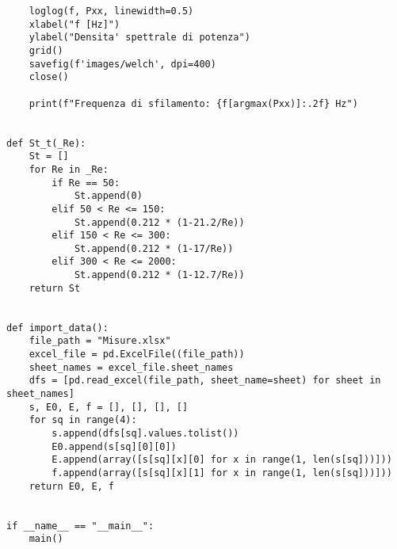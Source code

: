 \begin{lstlisting}
    loglog(f, Pxx, linewidth=0.5)
    xlabel("f [Hz]")
    ylabel("Densita' spettrale di potenza")
    grid()
    savefig(f'images/welch', dpi=400)
    close()

    print(f"Frequenza di sfilamento: {f[argmax(Pxx)]:.2f} Hz")
    

def St_t(_Re):
    St = []
    for Re in _Re:
        if Re == 50:
            St.append(0)
        elif 50 < Re <= 150:
            St.append(0.212 * (1-21.2/Re))
        elif 150 < Re <= 300:
            St.append(0.212 * (1-17/Re))
        elif 300 < Re <= 2000:
            St.append(0.212 * (1-12.7/Re))
    return St


def import_data():
    file_path = "Misure.xlsx"
    excel_file = pd.ExcelFile((file_path))
    sheet_names = excel_file.sheet_names
    dfs = [pd.read_excel(file_path, sheet_name=sheet) for sheet in sheet_names]
    s, E0, E, f = [], [], [], []
    for sq in range(4):
        s.append(dfs[sq].values.tolist())
        E0.append(s[sq][0][0])
        E.append(array([s[sq][x][0] for x in range(1, len(s[sq]))]))
        f.append(array([s[sq][x][1] for x in range(1, len(s[sq]))]))
    return E0, E, f


if __name__ == "__main__":
    main()
\end{lstlisting}